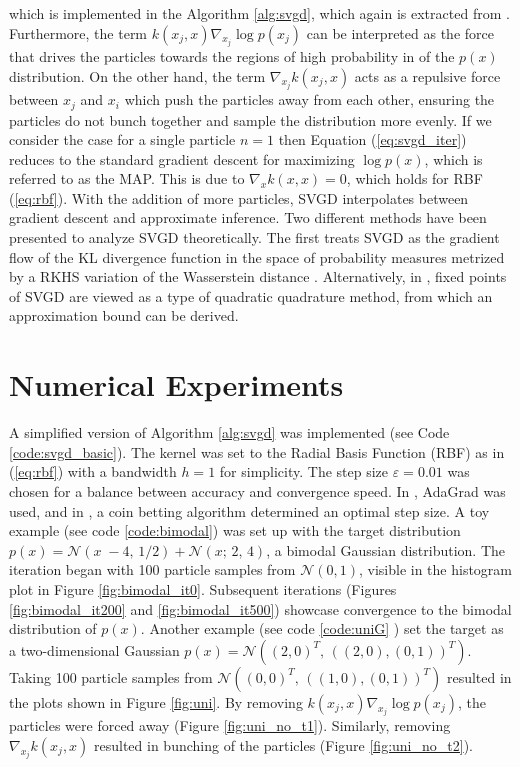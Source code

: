 \documentclass[11pt]{isr} %
\begin{document}
which is implemented in the Algorithm \ref{alg:svgd}, which again is extracted from \cite{liu2019stein}. 
Furthermore, the term $ k(x_j , x) \nabla_{x_j} \log p(x_j )$ can be interpreted as the force that drives the particles towards the regions of high probability in of the $p(x)$ distribution. 
On the other hand, the term $ \nabla_{x_j} k(x_j,x) $ acts as a repulsive force between $x_j$ and $x_i$ which push the particles away from each other, ensuring the particles do not bunch together and sample the distribution more evenly. 
If we consider the case for a single particle $n=1$ then Equation (\ref{eq:svgd_iter}) reduces to the standard gradient descent for maximizing $\log p(x)$, which is referred to as the MAP. 
This is due to $\nabla_x k(x,x) =0$, which holds for RBF (\ref{eq:rbf}).
With the addition of more particles, SVGD interpolates between gradient descent and approximate inference.
Two different methods have been presented to analyze SVGD theoretically.
The first treats SVGD as the gradient flow of the KL divergence function in the space of probability measures metrized by a RKHS variation of the Wasserstein distance \cite{liu2017stein}.
Alternatively, in \cite{liu2018stein}, fixed points of SVGD are viewed as a type of quadratic quadrature method, from which an approximation bound can be derived.
\section*{Numerical Experiments}
A simplified version of Algorithm \ref{alg:svgd} was implemented (see Code \ref{code:svgd_basic}).
The kernel was set to the Radial Basis Function (RBF) as in (\ref{eq:rbf}) with a bandwidth $h=1$ for simplicity.
The step size $\varepsilon =0.01$ was chosen for a balance between accuracy and convergence speed.
In \cite{liu2019stein}, AdaGrad was used, and in \cite{sharrock2023coin}, a coin betting algorithm determined an optimal step size.
A toy example (see code \ref{code:bimodal}) was set up with the target distribution $p(x) = \mathcal{N}(x\; -4, \,1/2) + \mathcal{N}(x;\,2, \,4)$, a bimodal Gaussian distribution.
The iteration began with 100 particle samples from $\mathcal{N}(0,1)$, visible in the histogram plot in Figure \ref{fig:bimodal_it0}.
Subsequent iterations (Figures \ref{fig:bimodal_it200} and \ref{fig:bimodal_it500}) showcase convergence to the bimodal distribution of $p(x)$.
Another example (see code \ref{code:uniG} ) set the target as a two-dimensional Gaussian $p(x) = \mathcal{N} \left( (2 , 0)^T , \, ( (2,0), (0,1))^T \right)$.
Taking 100 particle samples from $ \mathcal{N} \left( (0 , 0)^T , \, ( (1,0), (0,1))^T \right)$ resulted in the plots shown in Figure \ref{fig:uni}.
By removing $ k(x_j , x) \nabla_{x_j} \log p(x_j )$, the particles were forced away (Figure \ref{fig:uni_no_t1}).
Similarly, removing $ \nabla_{x_j} k(x_j,x) $ resulted in bunching of the particles (Figure \ref{fig:uni_no_t2}).
\end{document}
